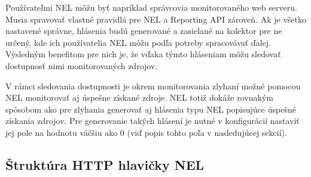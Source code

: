 Používateľmi NEL môžu byť napríklad správcovia monitorovaného web serveru.
Musia spravovať vlastné pravidlá pre NEL a Reporting API zároveň.
Ak je všetko nastavené správne, hlásenia budú generované a zasielané na kolektor pre ne určený, kde ich používatelia NEL môžu podľa potreby spracovávať ďalej.
Výsledným benefitom pre nich je, že vďaka týmto hláseniam môžu sledovať dostupnosť nimi monitorovaných zdrojov.

V rámci sledovania dostupnosti je okrem monitorovania zlyhaní možné pomocou NEL monitorovať aj úspešne získané zdroje.
NEL totiž dokáže rovnakým spôsobom ako pre zlyhania generovať aj hlásenia typu NEL popisujúce úspešné získania zdrojov.
Pre generovanie takých hlásení je nutné v konfigurácií nastaviť jej pole  na hodnotu väčšiu ako 0 (viď popis tohto poľa v nasledujúcej sekcií).


\subsection{Štruktúra HTTP hlavičky NEL}
\label{struktura-http-hlavicky-nel}

